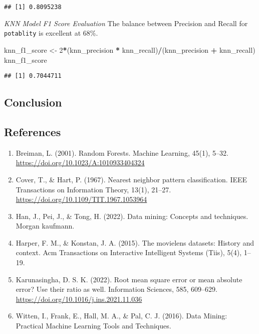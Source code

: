 \documentclass[
]{article}
\newenvironment{Shaded}{\begin{snugshade}}{\end{snugshade}}
\newcommand{\DecValTok}[1]{\textcolor[rgb]{0.00,0.00,0.81}{#1}}
\newcommand{\NormalTok}[1]{#1}
\newcommand{\OtherTok}[1]{\textcolor[rgb]{0.56,0.35,0.01}{#1}}
\newcommand{\SpecialCharTok}[1]{\textcolor[rgb]{0.81,0.36,0.00}{\textbf{#1}}}
\providecommand{\tightlist}{%
  \setlength{\itemsep}{0pt}\setlength{\parskip}{0pt}}
\begin{document}
\begin{verbatim}
## [1] 0.8095238
\end{verbatim}

\emph{KNN Model F1 Score Evaluation} The balance between Precision and
Recall for \texttt{potablity} is excellent at 68\%.

\begin{Shaded}
\begin{Highlighting}[]
\NormalTok{knn\_f1\_score }\OtherTok{\textless{}{-}} \DecValTok{2}\SpecialCharTok{*}\NormalTok{(knn\_precision }\SpecialCharTok{*}\NormalTok{ knn\_recall)}\SpecialCharTok{/}\NormalTok{(knn\_precision }\SpecialCharTok{+}\NormalTok{ knn\_recall)}
\NormalTok{knn\_f1\_score}
\end{Highlighting}
\end{Shaded}

\begin{verbatim}
## [1] 0.7044711
\end{verbatim}

\subsection{Conclusion}\label{conclusion}

\subsection{References}\label{references}

\begin{enumerate}
\def\labelenumi{\arabic{enumi}.}
\tightlist
\item
  Breiman, L. (2001). Random Forests. Machine Learning, 45(1), 5--32.
  \url{https://doi.org/10.1023/A:1010933404324}
\item
  Cover, T., \& Hart, P. (1967). Nearest neighbor pattern
  classification. IEEE Transactions on Information Theory, 13(1),
  21--27. \url{https://doi.org/10.1109/TIT.1967.1053964}
\item
  Han, J., Pei, J., \& Tong, H. (2022). Data mining: Concepts and
  techniques. Morgan kaufmann.
\item
  Harper, F. M., \& Konstan, J. A. (2015). The movielens datasets:
  History and context. Acm Transactions on Interactive Intelligent
  Systems (Tiis), 5(4), 1--19.
\item
  Karunasingha, D. S. K. (2022). Root mean square error or mean absolute
  error? Use their ratio as well. Information Sciences, 585, 609--629.
  \url{https://doi.org/10.1016/j.ins.2021.11.036}
\item
  Witten, I., Frank, E., Hall, M. A., \& Pal, C. J. (2016). Data Mining:
  Practical Machine Learning Tools and Techniques.
\end{enumerate}
\end{document}
